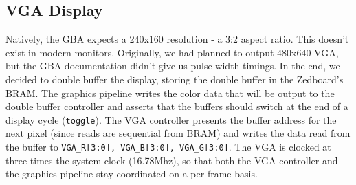 \documentclass[11pt,a4paper]{article}
\begin{document}
	\subsection{VGA Display}
	Natively, the GBA expects a 240x160 resolution - a 3:2 aspect ratio. This doesn't exist in modern monitors. Originally, we had planned to output 480x640 VGA, but the GBA documentation didn't give us pulse width timings. In the end, we decided to double buffer the display, storing the double buffer in the Zedboard's BRAM. The graphics pipeline writes the color data that will be output to the double buffer controller and asserts that the buffers should switch at the end of a display cycle (\texttt{toggle}). The VGA controller presents the buffer address for the next pixel (since reads are sequential from BRAM) and writes the data read from the buffer to \texttt{VGA\_R[3:0], VGA\_B[3:0], VGA\_G[3:0]}. The VGA is clocked at three times the system clock (16.78Mhz), so that both the VGA controller and the graphics pipeline stay coordinated on a per-frame basis. 
	
\end{document}
